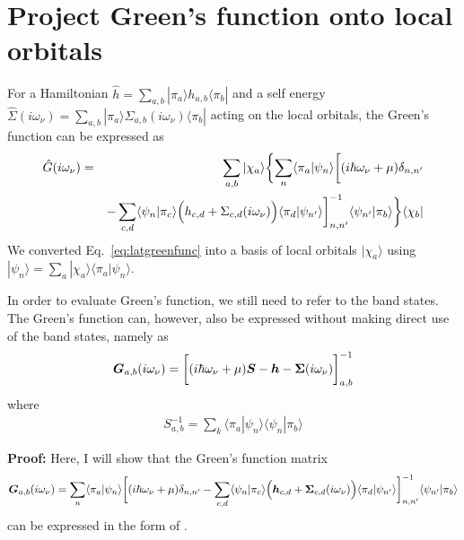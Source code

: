 \documentclass[11pt,a4paper]{report}
\begin{document}
\section{Project Green's function onto local orbitals}
For a Hamiltonian $\hat{h}=\sum_{a,b}|\pi_a\rangle
h_{a,b}\langle\pi_b|$ and a self energy 
$\hat{\Sigma}(i\omega_\nu)=
\sum_{a,b}|\pi_a\rangle
\Sigma_{a,b}(i\omega_\nu)
\langle\pi_b|$
acting on the local orbitals, the Green's function can be expressed
as
\begin{eqnarray}
\hat{G}(i\omega_\nu)&=&
\sum_{a,b}|\chi_a\rangle
\biggl\lbrace
\sum_n\langle\pi_a|\psi_n\rangle
\biggl[
(i\hbar\omega_\nu+\mu)\delta_{n,n'}
\nonumber\\
&&-\sum_{c,d}\langle\psi_n|\pi_c\rangle
\Bigl(h_{c,d}+\Sigma_{c,d}(i\omega_\nu)\Bigr)
\langle\pi_d|\psi_{n'}\rangle
\biggr]^{-1}_{n,n'}
\langle\psi_{n'}|\pi_b\rangle
\biggr\rbrace
\langle\chi_b|
\label{eq:greenlocorb}
\end{eqnarray}
We converted Eq.~\eqref{eq:latgreenfunc} into a basis of local
orbitals $|\chi_a\rangle$ using
$|\psi_n\rangle=\sum_a|\chi_a\rangle\langle\pi_a|\psi_n\rangle$.


In order to evaluate Green's function, we still need to refer to the
band states. The Green's function can, however, also be expressed
without making direct use of the band states, namely as
\begin{eqnarray}
\bm{G}_{a,b}(i\omega_\nu)
=\biggl[(i\hbar\omega_\nu+\mu)\bm{S}
-\bm{h}-\bm{\Sigma}(i\omega_\nu)\biggr]^{-1}
_{a,b}
\label{eq:greenlocform1}
\end{eqnarray}
where
\begin{eqnarray}
S^{-1}_{a,b}=\sum_k\langle\pi_a|\psi_n\rangle \langle\psi_n|\pi_b\rangle
\label{eq:inverses}
\end{eqnarray}

\textbf{Proof:}
Here, I will show that the Green's function matrix 
\begin{eqnarray}
\bm{G}_{a,b}(i\omega_\nu)=
\sum_n\langle\pi_a|\psi_n\rangle
\biggl[
(i\hbar\omega_\nu+\mu)\delta_{n,n'}-
\sum_{c,d}\langle\psi_n|\pi_c\rangle
\Bigl(\bm{h}_{c,d}+\bm{\Sigma}_{c,d}(i\omega_\nu)\Bigr)
\langle\pi_d|\psi_{n'}\rangle
\biggr]^{-1}_{n,n'}
\langle\psi_{n'}|\pi_b\rangle
\nonumber\\
\label{eq:greenlocform2}
\end{eqnarray}
can be expressed in the form of .
\end{document}
